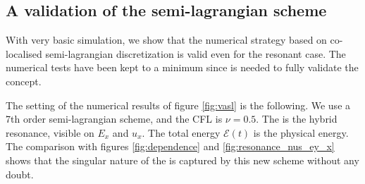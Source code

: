 

\FloatBarrier

\subsection{A validation of the semi-lagrangian scheme}

With very basic simulation, we show that the numerical strategy 
based on co-localised semi-lagrangian discretization is valid even for the resonant 
case.
The numerical tests have been kept to a minimum since  is needed to fully validate
the concept.

The setting of the numerical results of figure \ref{fig:vasl}
is the following. We use a 7th order semi-lagrangian scheme, and the CFL is $\nu=0.5$.
The  is the hybrid resonance, visible on $E_x$ and $u_x$.
The total energy $\mathcal E(t)$ is the physical energy. 
The comparison with figures \ref{fig:dependence} and \ref{fig:resonance_nus_ey_x} shows that the 
singular nature of the  is captured by this new scheme without any doubt.

